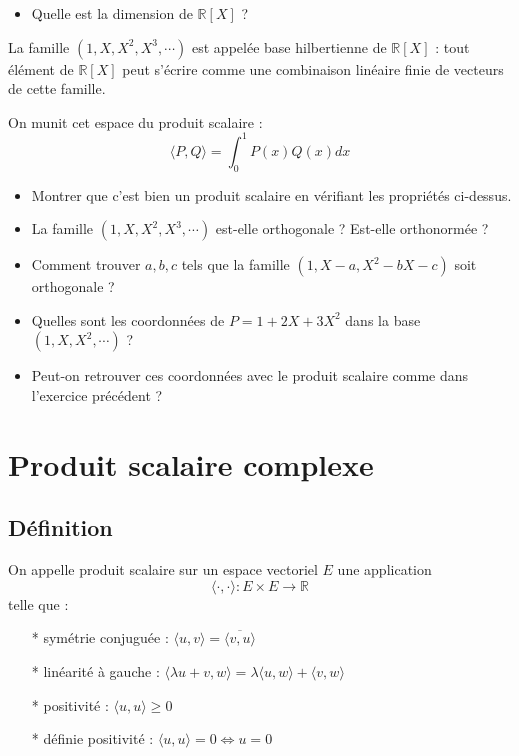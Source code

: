 \begin{itemize}
    \item Quelle est la dimension de $\mathbb{R}[X]$ ?
\end{itemize}
La famille $(1,X,X^2,X^3, \cdots )$ est appelée base hilbertienne de $\mathbb{R}[X]$ : tout élément de $\mathbb{R}[X]$ peut s'écrire comme une combinaison linéaire finie de vecteurs de cette famille.

On munit cet espace du produit scalaire : 
$$ \langle P, Q \rangle = \int_{0}^{1} P(x) Q(x) dx $$

\begin{itemize}
    \item Montrer que c'est bien un produit scalaire en vérifiant les propriétés ci-dessus.
    \item La famille $(1,X,X^2,X^3, \cdots )$ est-elle orthogonale ? Est-elle orthonormée ?
    \item Comment trouver $a, b, c$ tels que la famille $(1, X-a, X^2-bX-c)$ soit orthogonale ?
    \item Quelles sont les coordonnées de $P = 1+2X+3X^2$ dans la base $(1, X, X^2, \cdots)$ ?
    \item Peut-on retrouver ces coordonnées avec le produit scalaire comme dans l'exercice précédent ?
\end{itemize}
\vspace{1em}

\section*{Produit scalaire complexe}
\subsection{Définition}
On appelle produit scalaire sur un espace vectoriel $E$ une application 
$$\langle \cdot, \cdot \rangle : E \times E \to \mathbb{R}$$
telle que :
\begin{multicols}{2}
\begin{itemize}
    \item[*] symétrie conjuguée : $\langle u, v \rangle = \overline{\langle v, u \rangle}$
    \item[*] linéarité à gauche : $\langle \lambda u + v, w \rangle = \lambda \langle u, w \rangle + \langle v, w \rangle$
    \item[*] positivité : $\langle u, u \rangle \geq 0$
    \item[*] définie positivité : $\langle u, u \rangle = 0 \iff u = 0$
\end{itemize}
\end{multicols}


